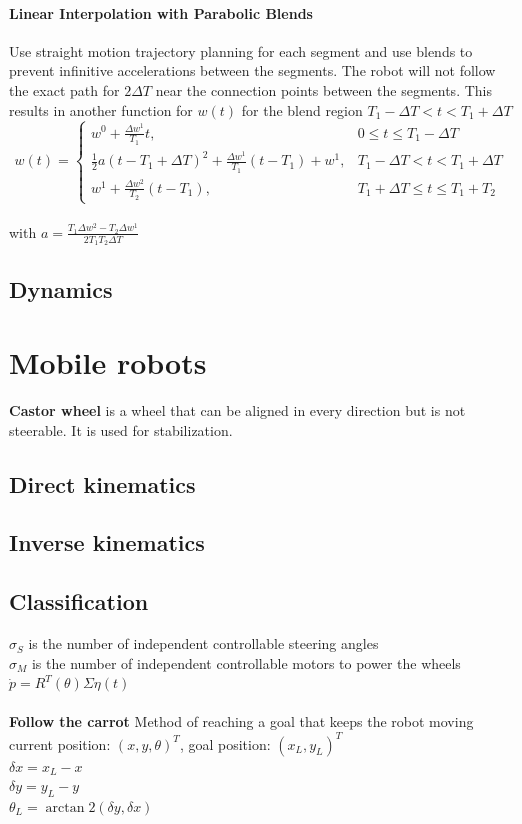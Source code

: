 \documentclass{article}
\begin{document}
	\paragraph{Linear Interpolation with Parabolic Blends} Use straight motion trajectory planning for each segment and use blends to prevent infinitive accelerations between the segments. The robot will not follow the exact path for $2 \Delta T$ near the connection points between the segments. This results in another function for $w(t)$ for the blend region $T_1 - \Delta T < t < T_1 + \Delta T$\\
	\begin{equation}
	w(t) = 
	\left\{ \begin{array}{ll}
	w^0 + \frac{\Delta w^1}{T_1} t, & 0 \leq t \leq T_1 - \Delta T\\
	\frac{1}{2} a (t - T_1 + \Delta T)^2 + \frac{\Delta w^1}{T_1} (t - T_1) + w^1, & T_1 - \Delta T < t < T_1 + \Delta T\\
	w^1 + \frac{\Delta w^2}{T_2} (t - T_1), & T_1 + \Delta T \leq t \leq T_1 + T_2
	\end{array} \right.
	\end{equation}\\
	with $a = \frac{T_1 \Delta w^2 - T_2 \Delta w^1}{2T_1 T_2 \Delta T}$
	
	
	\subsection{Dynamics}
	
	\section{Mobile robots}
	\textbf{Castor wheel} is a wheel that can be aligned in every direction but is not steerable. It is used for stabilization.
	\subsection{Direct kinematics}
	\subsection{Inverse kinematics}
	\subsection{Classification}
	$\sigma_S$ is the number of independent controllable steering angles\\
	$\sigma_M$ is the number of independent controllable motors to power the wheels\\
	$\dot{p} = R^T(\theta) \Sigma \eta(t)$\\
	\\
	\textbf{Follow the carrot} Method of reaching a goal that keeps the robot moving\\
	current position: $(x, y, \theta)^T$, goal position: $(x_L, y_L)^T$\\
	$\delta x = x_L - x$\\
	$\delta y = y_L - y$\\
	$\theta_L = \arctan2(\delta y, \delta x)$
\end{document}
